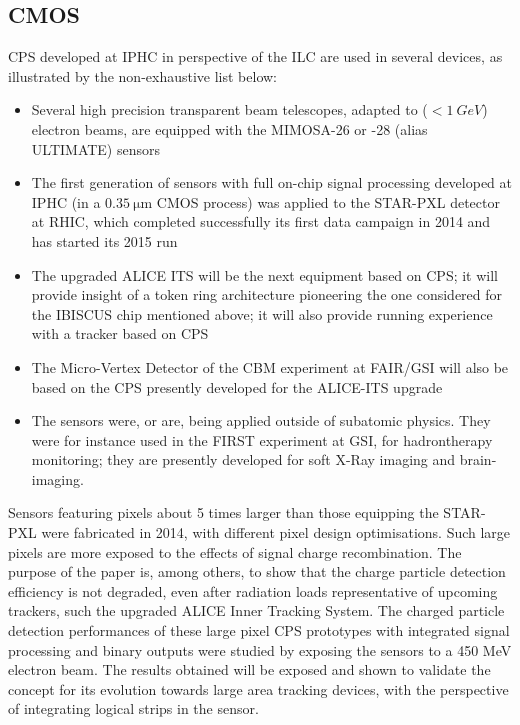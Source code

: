 \subsection{CMOS}
CPS developed at IPHC in perspective of the ILC are used in several
devices, as illustrated by the non-exhaustive list below:
\begin{itemize}
\item Several high precision transparent beam telescopes, adapted to
	($<\SI{1}{GeV}$) electron beams, are equipped with the MIMOSA-26 or
	-28 (alias ULTIMATE) sensors
\item The first generation of sensors with full on-chip signal processing
	developed at IPHC (in a $\SI{0.35}{\micro\meter}$ CMOS process) was applied to the
	STAR-PXL detector at RHIC, which completed successfully its first
	data campaign in 2014 and has started its 2015 run
\item The upgraded ALICE ITS will be the next equipment based on CPS;
	it will provide insight of a token ring architecture pioneering
	the one considered for the IBISCUS chip mentioned above; it will
	also provide running experience with a tracker based on CPS
\item The Micro-Vertex Detector of the CBM experiment at FAIR/GSI will
	also be based on the CPS presently developed for the ALICE-ITS
	upgrade
\item The sensors were, or are, being applied outside of subatomic physics.
	They were for instance used in the FIRST experiment at GSI, for
	hadrontherapy monitoring; they are presently developed for soft
	X-Ray imaging and brain-imaging.
\end{itemize}

Sensors featuring pixels about 5 times larger than those equipping the STAR-PXL were fabricated in 2014, with different pixel design optimisations. Such large pixels are more exposed to the effects of signal charge recombination. The purpose of the paper is, among others, to show that the charge particle detection efficiency is not degraded, even after radiation loads representative of upcoming trackers, such the upgraded ALICE Inner Tracking System. The charged particle detection performances of these large pixel CPS prototypes with integrated signal processing and binary outputs were studied by exposing the sensors to a 450 MeV electron beam. The results obtained will be exposed
and shown to validate the concept for its evolution towards large area tracking devices, with the perspective of integrating logical strips in the sensor.

